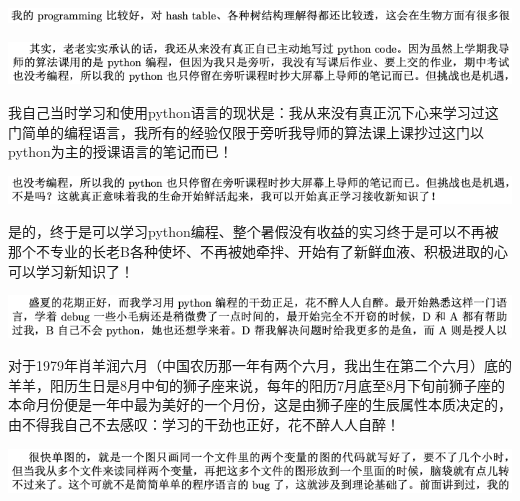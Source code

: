 \documentclass[9pt, b5paper]{article}
\begin{document}
\begin{center}
\includegraphics[width=.9\linewidth]{./pic/backups_plans_20210508_114838.png}
\end{center}

\begin{center}
\includegraphics[width=.9\linewidth]{./pic/backups_plans_20210508_115010.png}
\end{center}

我自己当时学习和使用python语言的现状是：我从来没有真正沉下心来学习过这门简单的编程语言，我所有的经验仅限于旁听我导师的算法课上课抄过这门以python为主的授课语言的笔记而已！

\begin{center}
\includegraphics[width=.9\linewidth]{./pic/backups_plans_20210508_115037.png}
\end{center}

是的，终于是可以学习python编程、整个暑假没有收益的实习终于是可以不再被那个不专业的长老B各种使坏、不再被她牵拌、开始有了新鲜血液、积极进取的心可以学习新知识了！

\begin{center}
\includegraphics[width=.9\linewidth]{./pic/backups_plans_20210508_121607.png}
\end{center}

对于1979年肖羊润六月（中国农历那一年有两个六月，我出生在第二个六月）底的羊羊，阳历生日是8月中旬的狮子座来说，每年的阳历7月底至8月下旬前狮子座的本命月份便是一年中最为美好的一个月份，这是由狮子座的生辰属性本质决定的，由不得我自己不去感叹：学习的干劲也正好，花不醉人人自醉！

\begin{center}
\includegraphics[width=.9\linewidth]{./pic/backups_plans_20210508_122708.png}
\end{center}
\end{document}
